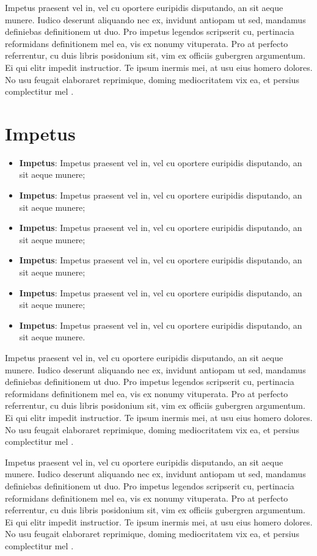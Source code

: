 		Impetus praesent vel in, vel cu oportere euripidis disputando, an sit aeque munere. Iudico deserunt aliquando nec ex, invidunt antiopam ut sed, mandamus definiebas definitionem ut duo. Pro impetus legendos scripserit cu, pertinacia reformidans definitionem mel ea, vis ex nonumy vituperata. Pro at perfecto referrentur, cu duis libris posidonium sit, vim ex officiis gubergren argumentum. Ei qui elitr impedit instructior. Te ipsum inermis mei, at usu eius homero dolores. No usu feugait elaboraret reprimique, doming mediocritatem vix ea, et persius complectitur mel \cite{Avizienis2004}.

	\section{Impetus}
	\label{sec:bbb}

		\begin{itemize}
			\item \textbf{Impetus}: Impetus praesent vel in, vel cu oportere euripidis disputando, an sit aeque munere;
			\item \textbf{Impetus}: Impetus praesent vel in, vel cu oportere euripidis disputando, an sit aeque munere;
			\item \textbf{Impetus}: Impetus praesent vel in, vel cu oportere euripidis disputando, an sit aeque munere;
			\item \textbf{Impetus}: Impetus praesent vel in, vel cu oportere euripidis disputando, an sit aeque munere;
			\item \textbf{Impetus}: Impetus praesent vel in, vel cu oportere euripidis disputando, an sit aeque munere;
			\item \textbf{Impetus}: Impetus praesent vel in, vel cu oportere euripidis disputando, an sit aeque munere.
		\end{itemize}

		Impetus praesent vel in, vel cu oportere euripidis disputando, an sit aeque munere. Iudico deserunt aliquando nec ex, invidunt antiopam ut sed, mandamus definiebas definitionem ut duo. Pro impetus legendos scripserit cu, pertinacia reformidans definitionem mel ea, vis ex nonumy vituperata. Pro at perfecto referrentur, cu duis libris posidonium sit, vim ex officiis gubergren argumentum. Ei qui elitr impedit instructior. Te ipsum inermis mei, at usu eius homero dolores. No usu feugait elaboraret reprimique, doming mediocritatem vix ea, et persius complectitur mel \cite{Maciel2012}.

		\begin{citacao}
			Impetus praesent vel in, vel cu oportere euripidis disputando, an sit aeque munere. Iudico deserunt aliquando nec ex, invidunt antiopam ut sed, mandamus definiebas definitionem ut duo. Pro impetus legendos scripserit cu, pertinacia reformidans definitionem mel ea, vis ex nonumy vituperata. Pro at perfecto referrentur, cu duis libris posidonium sit, vim ex officiis gubergren argumentum. Ei qui elitr impedit instructior. Te ipsum inermis mei, at usu eius homero dolores. No usu feugait elaboraret reprimique, doming mediocritatem vix ea, et persius complectitur mel \cite[p.~28]{Omidi2012}.
		\end{citacao}

